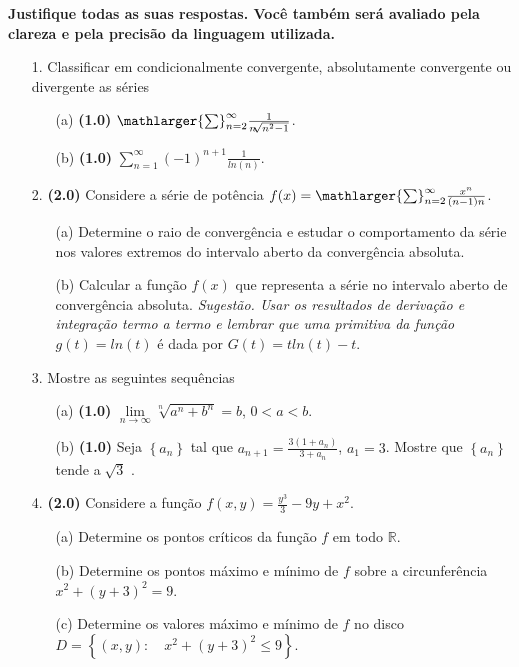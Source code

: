 \documentclass[oneside,a4paper,12pt]{article}
\begin{document}
	\vspace{10pt}
\textbf{Justifique todas as suas respostas. Você também será avaliado pela clareza e pela precisão da linguagem utilizada.}
\begin{itemize}
\item[1.] Classificar em condicionalmente convergente, absolutamente convergente ou divergente as séries 
\begin{itemize}
\item[(a)]\textbf{(1.0)}   $\mathlarger{\sum}_{n=2}^{\infty}\frac{1}{n\sqrt[]{n^{2}-1}}$. 
\item[(b)]\textbf{(1.0)} $\sum_{n=1}^{\infty} (-1)^{n+1}\frac{1}{ln(n)} $.\\
\end{itemize}
\end{itemize}
\begin{itemize} 
\item[2.]\textbf{(2.0)} Considere a série de potência $f(x)=\mathlarger{\sum}_{n=2}^{\infty}\frac{x^{n}}{(n-1)n}$.
	\begin{itemize} 
	\item[(a)] Determine o raio de convergência e estudar o comportamento da série nos valores extremos do intervalo aberto da convergência absoluta.
	\item[(b)] Calcular a função $f(x)$ que representa a série no intervalo aberto de convergência absoluta.
	\textit{Sugestão. Usar os resultados de derivação e integração termo a termo e lembrar que uma primitiva da função} $g(t)=ln(t)$ é dada por $G(t)=tln(t)-t$.
    \end{itemize}
\end{itemize}
\begin{itemize}
\item[3.] Mostre as seguintes sequências
	\begin{itemize}
	\item[(a)]\textbf{(1.0)} $\lim\limits_{n\longrightarrow \infty} \sqrt[n]{a^{n}+b^{n}}=b$, $0<a<b$.
	\item[(b)]\textbf{(1.0)} Seja $\left\lbrace a_{n}\right\rbrace $ tal que $a_{n+1}=\frac{3(1+a_{n})}{3+a_{n}}$, $a_{1}=3$. Mostre que $\left\lbrace a_{n}\right\rbrace $ tende a\quad $\sqrt[]{3}$ .
    \end{itemize}
\end{itemize}
\begin{itemize}
\item[4.]\textbf{(2.0)} Considere a função $f(x,y)=\frac{y^{3}}{3}-9y+x^{2}$.
\begin{itemize} 
	\item[(a)] Determine os pontos críticos da função $f$ em todo $\mathbb{R}$.
	\item[(b)] Determine os pontos máximo e mínimo de $f$ sobre a circunferência $x^{2}+(y+3)^{2}=9$.
	\item[(c)] Determine os valores máximo e mínimo de $f$ no disco $D=\left\lbrace (x,y):\quad x^{2}+(y+3)^{2}\leq 9\right\rbrace $.
\end{itemize}
\end{itemize}
\end{document}
